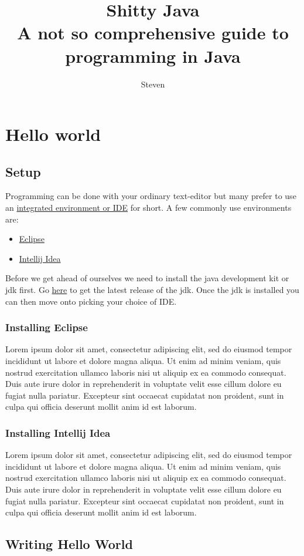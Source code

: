 \documentclass{article}
\title{Shitty Java \\ {\large A not so comprehensive guide to programming in Java}}
\author{Steven}
\begin{document}
\begin{titlepage}
	\maketitle
\end{titlepage}

\tableofcontents
\newpage

\section{Hello world}
\subsection{Setup}
Programming can be done with your ordinary text-editor but many prefer to use an
\href{https://wikipedia.org/wiki/Integrated_development_environment}{integrated environment or IDE} for short. A few commonly use environments are:
\begin{itemize}
	\item \href{https://www.eclipse.org/downloads/}{Eclipse}
	\item \href{https://www.jetbrains.com/idea/download/}{Intellij Idea}
\end{itemize}
Before we get ahead of ourselves we need to install the java development kit or jdk first. Go \href{https://www.oracle.com/technetwork/java/javase/downloads/index.html}{here} to get the latest release of the jdk. Once the jdk is installed you can then move onto picking your choice of IDE.

\subsubsection{Installing Eclipse}
Lorem ipsum dolor sit amet, consectetur adipiscing elit, sed do eiusmod tempor incididunt ut labore et dolore magna aliqua. Ut enim ad minim veniam, quis nostrud exercitation ullamco laboris nisi ut aliquip ex ea commodo consequat. Duis aute irure dolor in reprehenderit in voluptate velit esse cillum dolore eu fugiat nulla pariatur. Excepteur sint occaecat cupidatat non proident, sunt in culpa qui officia deserunt mollit anim id est laborum.


\subsubsection{Installing Intellij Idea}
Lorem ipsum dolor sit amet, consectetur adipiscing elit, sed do eiusmod tempor incididunt ut labore et dolore magna aliqua. Ut enim ad minim veniam, quis nostrud exercitation ullamco laboris nisi ut aliquip ex ea commodo consequat. Duis aute irure dolor in reprehenderit in voluptate velit esse cillum dolore eu fugiat nulla pariatur. Excepteur sint occaecat cupidatat non proident, sunt in culpa qui officia deserunt mollit anim id est laborum.

\subsection{Writing Hello World}
\end{document}
